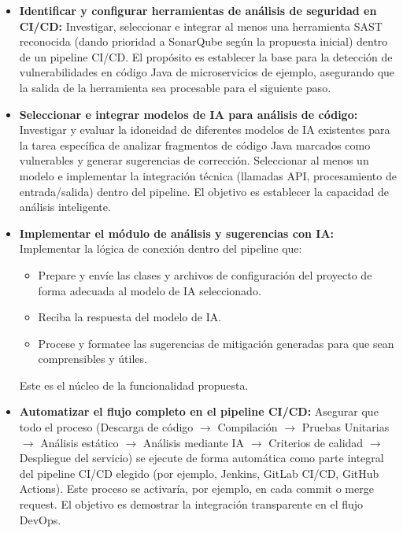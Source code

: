 \begin{itemize}
    \item \textbf{Identificar y configurar herramientas de análisis de seguridad en CI/CD:} Investigar, seleccionar e integrar al menos una herramienta SAST reconocida (dando prioridad a SonarQube según la propuesta inicial) dentro de un pipeline CI/CD. El propósito es establecer la base para la detección de vulnerabilidades en código Java de microservicios de ejemplo, asegurando que la salida de la herramienta sea procesable para el siguiente paso.
    
    \item \textbf{Seleccionar e integrar modelos de IA para análisis de código:} Investigar y evaluar la idoneidad de diferentes modelos de IA existentes para la tarea específica de analizar fragmentos de código Java marcados como vulnerables y generar sugerencias de corrección. Seleccionar al menos un modelo e implementar la integración técnica (llamadas API, procesamiento de entrada/salida) dentro del pipeline. El objetivo es establecer la capacidad de análisis inteligente.
    
    \item \textbf{Implementar el módulo de análisis y sugerencias con IA:} Implementar la lógica de conexión dentro del pipeline que:
    \begin{itemize}
        \item Prepare y envíe las clases y archivos de configuración del proyecto de forma adecuada al modelo de IA seleccionado.
        \item Reciba la respuesta del modelo de IA.
        \item Procese y formatee las sugerencias de mitigación generadas para que sean comprensibles y útiles.
    \end{itemize}
    Este es el núcleo de la funcionalidad propuesta.
    
    \item \textbf{Automatizar el flujo completo en el pipeline CI/CD:} Asegurar que todo el proceso (Descarga de código $\rightarrow$ Compilación $\rightarrow$ Pruebas Unitarias $\rightarrow$ Análisis estático $\rightarrow$ Análisis mediante IA $\rightarrow$ Criterios de calidad $\rightarrow$ Despliegue del servicio) se ejecute de forma automática como parte integral del pipeline CI/CD elegido (por ejemplo, Jenkins, GitLab CI/CD, GitHub Actions). Este proceso se activaría, por ejemplo, en cada commit o merge request. El objetivo es demostrar la integración transparente en el flujo DevOps.
    

\end{itemize}
